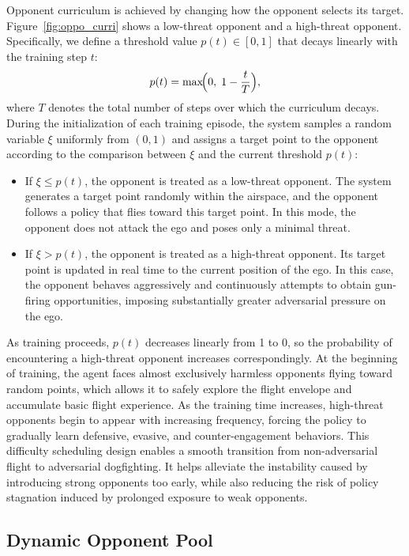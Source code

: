 \documentclass[pdflatex,sn-mathphys-num]{sn-jnl}%
\theoremstyle{thmstyleone}%
\theoremstyle{thmstyletwo}%
\theoremstyle{thmstylethree}%
\begin{document}
Opponent curriculum is achieved by changing how the opponent selects its target. Figure~\ref{fig:oppo_curri} shows a low-threat opponent and a high-threat opponent. Specifically, we define a threshold value $p(t)\in[0,1]$ that decays linearly with the training step $t$:
\begin{equation}
p(t) = \max\!\Bigl(0,\; 1-\frac{t}{T}\Bigr),
\end{equation}
where $T$ denotes the total number of steps over which the curriculum decays. During the initialization of each training episode, the system samples a random variable $\xi$ uniformly from $(0,1)$ and assigns a target point to the opponent according to the comparison between $\xi$ and the current threshold $p(t)$:
\begin{itemize}
\item If $\xi \leq p(t)$, the opponent is treated as a low-threat opponent. The system generates a target point randomly within the airspace, and the opponent follows a policy that flies toward this target point. In this mode, the opponent does not attack the ego and poses only a minimal threat.
\item If $\xi > p(t)$, the opponent is treated as a high-threat opponent. Its target point is updated in real time to the current position of the ego. In this case, the opponent behaves aggressively and continuously attempts to obtain gun-firing opportunities, imposing substantially greater adversarial pressure on the ego.
\end{itemize}

As training proceeds, $p(t)$ decreases linearly from 1 to 0, so the probability of encountering a high-threat opponent increases correspondingly. At the beginning of training, the agent faces almost exclusively harmless opponents flying toward random points, which allows it to safely explore the flight envelope and accumulate basic flight experience. As the training time increases, high-threat opponents begin to appear with increasing frequency, forcing the policy to gradually learn defensive, evasive, and counter-engagement behaviors. This difficulty scheduling design enables a smooth transition from non-adversarial flight to adversarial dogfighting. It helps alleviate the instability caused by introducing strong opponents too early, while also reducing the risk of policy stagnation induced by prolonged exposure to weak opponents.

\subsection{Dynamic Opponent Pool}
\label{sec:dynamic_opponent_pool}
\end{document}
